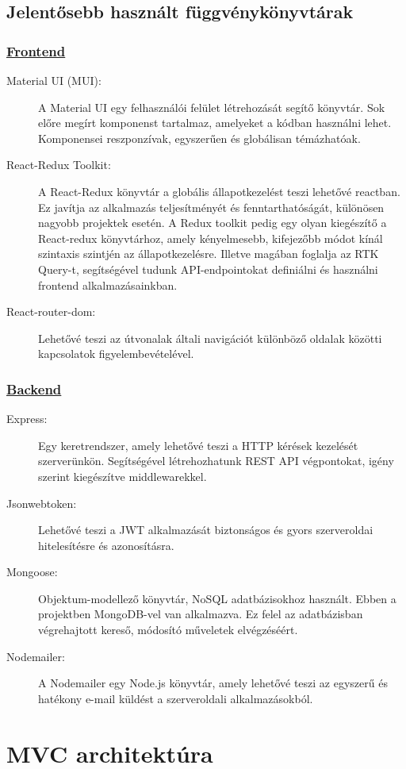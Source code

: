 \subsection{Jelentősebb használt függvénykönyvtárak}

\subsubsection{\underline{Frontend}}

\begin{description}
	\item[Material UI (MUI): \cite{materialui}] A Material UI egy felhasználói felület létrehozását segítő könyvtár. Sok előre megírt komponenst tartalmaz, amelyeket a kódban használni lehet. Komponensei reszponzívak, egyszerűen és globálisan témázhatóak.
	\item[React-Redux Toolkit: \cite{reactredux}] A React-Redux könyvtár a globális állapotkezelést teszi lehetővé reactban. Ez javítja az alkalmazás teljesítményét és fenntarthatóságát, különösen nagyobb projektek esetén. A Redux toolkit pedig egy olyan kiegészítő a React-redux könyvtárhoz, amely kényelmesebb, kifejezőbb módot kínál szintaxis szintjén az állapotkezelésre. Illetve magában foglalja az RTK Query-t, segítségével tudunk API-endpointokat definiálni és használni frontend alkalmazásainkban. 
	\item[React-router-dom: \cite{reactrouterdom}] Lehetővé teszi az útvonalak általi navigációt különböző oldalak közötti kapcsolatok figyelembevételével.
\end{description}

\subsubsection{\underline{Backend}}
\begin{description}
	\item[Express: \cite{express}] Egy keretrendszer, amely lehetővé teszi a HTTP kérések kezelését szerverünkön. Segítségével létrehozhatunk REST API végpontokat, igény szerint kiegészítve middlewarekkel.
	\item[Jsonwebtoken: \cite{jsonwebtoken}] Lehetővé teszi a JWT alkalmazását biztonságos és gyors szerveroldai hitelesítésre és azonosításra.
	\item[Mongoose: \cite{mongoose}] Objektum-modellező könyvtár, NoSQL adatbázisokhoz használt. Ebben a projektben MongoDB-vel van alkalmazva. Ez felel az adatbázisban végrehajtott kereső, módosító műveletek elvégzéséért.
	\item[Nodemailer: \cite{nodemailer}] A Nodemailer egy Node.js könyvtár, amely lehetővé teszi az egyszerű és hatékony e-mail küldést a szerveroldali alkalmazásokból.
\end{description}

\pagebreak

\section{MVC architektúra}